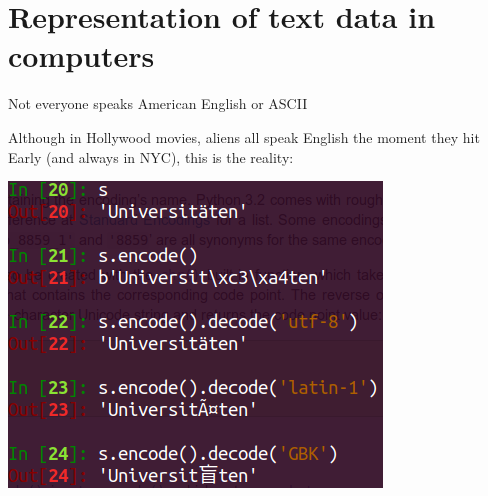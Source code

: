 \documentclass[11pt, handout]{beamer}
\begin{document}
% 
% 
% 
% 
%  
%  

% 




\section{Representation of text data in computers}

\begin{frame}{Not everyone speaks American English or ASCII}

Although in Hollywood movies, aliens all speak English the moment they hit Early (and always in NYC), this is the reality: 

 \includegraphics[width=.6\textwidth]{UTF8_Byte.png}
\end{frame}
\end{document}
